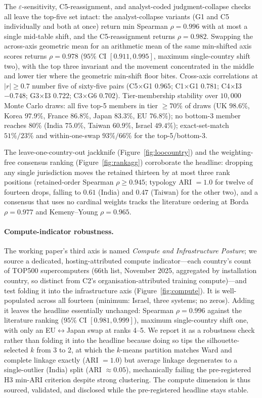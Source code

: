 \documentclass[11pt]{article}
\begin{document}
The $\varepsilon$-sensitivity, C5-reassignment, and analyst-coded judgment-collapse checks all leave the top-five set intact: the analyst-collapse variants (G1 and C5 individually and both at once) return min Spearman $\rho=0.996$ with at most a single mid-table shift, and the C5-reassignment returns $\rho=0.982$. Swapping the across-axis geometric mean for an arithmetic mean of the same min-shifted axis scores returns $\rho=0.978$ ($95\%$ CI $[0.911,0.995]$, maximum single-country shift two), with the top three invariant and the movement concentrated in the middle and lower tier where the geometric min-shift floor bites. Cross-axis correlations at $|r|\geq0.7$ number five of sixty-five pairs (C5$\times$G1 $0.965$; C1$\times$G1 $0.781$; C4$\times$I3 $-0.748$; G3$\times$I3 $0.722$; C3$\times$G6 $0.702$). Tier-membership stability over $10{,}000$ Monte Carlo draws: all five top-5 members in tier $\geq70\%$ of draws (UK $98.6\%$, Korea $97.9\%$, France $86.8\%$, Japan $83.3\%$, EU $76.8\%$); no bottom-3 member reaches $80\%$ (India $75.0\%$, Taiwan $60.9\%$, Israel $49.4\%$); exact-set-match $51\%/23\%$ and within-one-swap $93\%/66\%$ for the top-5/bottom-3.

The leave-one-country-out jackknife (Figure~\ref{fig:loocountry}) and the weighting-free consensus ranking (Figure~\ref{fig:rankagg}) corroborate the headline: dropping any single jurisdiction moves the retained thirteen by at most three rank positions (retained-order Spearman $\rho \geq 0.945$; typology ARI $=1.0$ for twelve of fourteen drops, falling to $0.61$ (India) and $0.47$ (Taiwan) for the other two), and a consensus that uses no cardinal weights tracks the literature ordering at Borda $\rho = 0.977$ and Kemeny--Young $\rho = 0.965$.

\paragraph{Compute-indicator robustness.} The working paper's third axis is named \emph{Compute and Infrastructure Posture}; we source a dedicated, hosting-attributed compute indicator---each country's count of TOP500 supercomputers \citep{top500_2025} (66th list, November 2025, aggregated by installation country, so distinct from C2's organisation-attributed training compute)---and test folding it into the infrastructure axis (Figure~\ref{fig:compute}). It is well-populated across all fourteen (minimum: Israel, three systems; no zeros). Adding it leaves the headline essentially unchanged: Spearman $\rho=0.996$ against the literature ranking ($95\%$ CI $[0.981,0.999]$), maximum single-country shift one, with only an EU$\leftrightarrow$Japan swap at ranks 4--5. We report it as a robustness check rather than folding it into the headline because doing so tips the silhouette-selected $k$ from 3 to 2, at which the $k$-means partition matches Ward and complete linkage exactly (ARI $=1.0$) but average linkage degenerates to a single-outlier (India) split (ARI $\approx0.05$), mechanically failing the pre-registered H3 min-ARI criterion despite strong clustering. The compute dimension is thus sourced, validated, and disclosed while the pre-registered headline stays stable.
\end{document}
